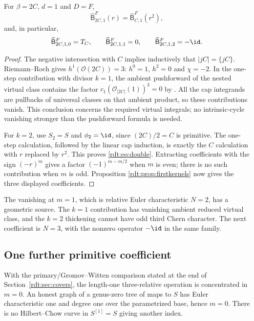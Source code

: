 \begin{proposition}\label{rdt:prop:double}
For $\beta=2C$, $d=1$ and $D=F$,
\begin{equation}\label{rdt:eq:double}
 \widehat{\mathsf B}^F_{2C,1}(r)=\widehat{\mathsf B}^F_{C,1}(r^2),
\end{equation}
and, in particular,
\[
 \widehat{\mathsf B}^F_{2C,1,0}=T_C,\qquad
 \widehat{\mathsf B}^F_{2C,1,1}=0,\qquad
 \widehat{\mathsf B}^F_{2C,1,2}=-\id.
\]
\end{proposition}
\begin{proof}
The negative intersection with $C$ implies inductively that
$|jC|=\{jC\}$. Riemann--Roch gives $h^1(\mathcal O(2C))=3$:
$h^0=1$, $h^2=0$ and $\chi=-2$. In the one-step contribution
with divisor $k=1$, the ambient pushforward of the nested virtual
class contains the factor
$c_1(\mathcal O_{|2C|}(1))^3=0$ by
\cite[Theorem 3.1]{OberdieckMC}. All the cap integrands are pullbacks
of universal classes on that ambient product, so these contributions
vanish. This conclusion concerns the required virtual integrals; no
intrinsic-cycle vanishing stronger than the pushforward formula is
needed.

For $k=2$, use $S_2=S$ and $\phi_2=\id$, since $(2C)/2=C$ is
primitive. The one-step calculation, followed by the linear cap
induction, is exactly the $C$ calculation with $r$ replaced by $r^2$.
This proves \eqref{rdt:eq:double}. Extracting coefficients with the
sign $(-r)^m$ gives a factor $(-1)^{m-m/2}$ when $m$ is even;
there is no such contribution when $m$ is odd. Proposition
\ref{rdt:prop:firstkernels} now gives the three displayed coefficients.
\end{proof}

The vanishing at $m=1$, which is relative Euler
characteristic $N=2$, has a geometric source. The $k=1$ contribution
has vanishing ambient reduced virtual class, and the $k=2$ thickening
cannot have odd third Chern character. The next coefficient is
$N=3$, with the nonzero operator $-\id$ in the same family.

\subsection{One further primitive coefficient}

With the primary/Gromov--Witten comparison stated at the end of
Section~\ref{rdt:sec:covers}, the length-one three-relative operation
is concentrated in $m=0$. An honest graph of a genus-zero tree of
maps to $S$ has Euler characteristic one and degree one over the
parametrized base, hence $m=0$. There is no Hilbert--Chow curve in
$S^{[1]}=S$ giving another index.

